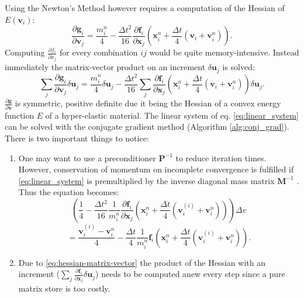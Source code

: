 \documentclass[m,times]{cgMA}
\begin{document}
Using the Newton's Method however requires a computation of the Hessian of $E(\boldsymbol{v}_i)$:
\begin{equation}
  \frac{\partial \boldsymbol{g}_i}{\partial \boldsymbol{v}_j} = \frac{m_i^n}{4} - \frac{\Delta t^2}{16}\frac{\partial \boldsymbol{f}_i}{\partial \boldsymbol{x}_j}\left(\boldsymbol{x}_i^n + \frac{\Delta t}{4} (\boldsymbol{v}_i + \boldsymbol{v}_i^{n})\right).
\end{equation}
Computing $\frac{\partial f_i}{\partial x_j}$ for every combination $ij$ would be quite memory-intensive. Instead immediately the matrix-vector product on an increment $\delta \boldsymbol{u}_j$ is solved:
\begin{equation}\label{eq:hessian-matrix-vector}
  \sum_j\frac{\partial \boldsymbol{g}_i}{\partial \boldsymbol{v}_j}\delta \boldsymbol{u}_j = \frac{m_i^n}{4}\delta \boldsymbol{u}_j - \frac{\Delta t^2}{16}\sum_j \frac{\partial \boldsymbol{f}_i}{\partial \boldsymbol{x}_j}\left(\boldsymbol{x}_i^n + \frac{\Delta t}{4} (\boldsymbol{v}_i + \boldsymbol{v}_i^{n})\right) \delta \boldsymbol{u}_j.
\end{equation}
$\frac{\partial \boldsymbol{g}}{\partial \boldsymbol{v}}$ is symmetric, positive definite due it being the Hessian of a convex energy function $E$ of a hyper-elastic material.
The linear system of eq. \ref{eq:linear_system} can be solved with the conjugate gradient method (Algorithm \ref{alg:conj_grad}). There is two important things to notice:
\begin{enumerate}
  \item  One may want to use a preconditioner $\boldsymbol{P}^{-1}$ to reduce iteration times. However, conservation of momentum on incomplete convergence is fulfilled if \ref{eq:linear_system} is premultiplied by the inverse diagonal mass matrix $\boldsymbol{M}^{-1}$ \cite{MPM:APIC}. Thus the equation becomes:
    $$
      \left(\frac{1}{4} - \frac{\Delta t^2}{16}\frac{1}{m_i^n}\frac{\partial \boldsymbol{f}_i}{\partial \boldsymbol{x}_j}\left(\boldsymbol{x}_i^n + \frac{\Delta t}{4} (\boldsymbol{v}^{(i)}_i + \boldsymbol{v}_i^{n})\right)\right) \Delta v
      $$
    \begin{equation}
      = \frac{\boldsymbol{v}_i^{(i)}-\boldsymbol{v}_i^n}{4} -\frac{\Delta t}{4}\frac{1}{m_i^n}\boldsymbol{f}_i\left(\boldsymbol{x}_i^n + \frac{\Delta t}{4} (\boldsymbol{v}^{(i)}_i + \boldsymbol{v}_i^{n})\right).
    \end{equation}
  \item Due to \ref{eq:hessian-matrix-vector} the product of the Hessian with an increment ($\sum_j \frac{\partial \boldsymbol{f}_i}{\partial \boldsymbol{x}_j} \delta \boldsymbol{u}_j$) needs to be computed anew every step since a pure matrix store is too costly.
\end{enumerate}
\end{document}
